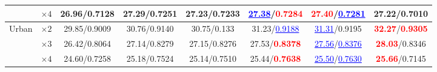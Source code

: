 \documentclass[runningheads]{llncs}
\begin{document}
\begin{table}[bht]
\begin{tabular}{|c|c|c|c|c|c|c|c|}
&$\times 4$&26.96/0.7128&27.29/0.7251&27.23/0.7233&\textcolor{blue}{\underline{27.38}}/\textcolor{red}{\textbf{0.7284}}&\textcolor{red}{\textbf{27.40}}/\textcolor{blue}{\underline{0.7281}}&27.22/0.7010\\
\hline
\hline
\multirow{3}{*}{Urban}&$\times 2$&29.85/0.9009&30.76/0.9140&30.75/0.133&31.23/\textcolor{blue}{\underline{0.9188}}&\textcolor{blue}{\underline{31.31}}/0.9195&\textcolor{red}{\textbf{32.27}}/\textcolor{red}{\textbf{0.9305}}\\
&$\times 3$&26.42/0.8064&27.14/0.8279&27.15/0.8276&27.53/\textcolor{red}{\textbf{0.8378}}&\textcolor{blue}{\underline{27.56}}/\textcolor{blue}{\underline{0.8376}}&\textcolor{red}{\textbf{28.03}}/0.8346\\ &$\times 4$&24.60/0.7258&25.18/0.7524&25.14/0.7510&25.44/\textcolor{red}{\textbf{0.7638}}&\textcolor{blue}{\underline{25.50}}/\textcolor{blue}{\underline{0.7630}}&\textcolor{red}{\textbf{25.66}}/0.7145\\
\hline
\end{tabular}
\label{tab:result}
\end{table}
\end{document}
